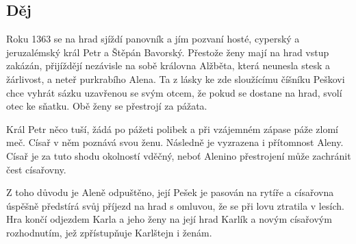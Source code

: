 \subsection*{Děj}
Roku 1363 se na hrad sjíždí panovník a jím pozvaní hosté, cyperský a jeruzalémský král Petr a Štěpán Bavorský.
Přestože ženy mají na hrad vstup zakázán, přijíždějí nezávisle na sobě královna Alžběta, která neunesla stesk a žárlivost, a neteř purkrabího Alena.
Ta z lásky ke zde sloužícímu číšníku Peškovi chce vyhrát sázku uzavřenou se svým otcem, že pokud se dostane na hrad, svolí otec ke sňatku.
Obě ženy se přestrojí za pážata.

Král Petr něco tuší, žádá po pážeti polibek a při vzájemném zápase páže zlomí meč.
Císař v něm poznává svou ženu.
Následně je vyzrazena i přítomnost Aleny.
Císař je za tuto shodu okolností vděčný, neboť Alenino přestrojení může zachránit čest císařovny.

Z toho důvodu je Aleně odpuštěno, její Pešek je pasován na rytíře a císařovna úspěšně předstírá svůj příjezd na hrad s omluvou, že se při lovu ztratila v lesích.
Hra končí odjezdem Karla a jeho ženy na její hrad Karlík a novým císařovým rozhodnutím, jež zpřístupňuje Karlštejn i ženám.
